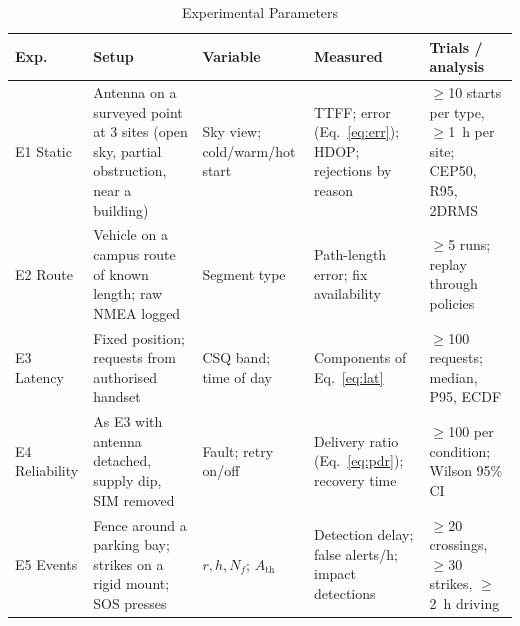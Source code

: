 \documentclass[conference]{IEEEtran}
\begin{document}
\begin{table}[!t]
\caption{Experimental Parameters}
\label{tab:params}
\centering
\scriptsize
\begin{tabular}{@{}L{1.5cm}L{4.4cm}L{2.6cm}L{3.8cm}L{3.9cm}@{}}
\toprule
Exp. & Setup & Variable & Measured & Trials / analysis \\
\midrule
E1 Static & Antenna on a surveyed point at 3 sites (open sky, partial obstruction, near a building) & Sky view; cold/warm/hot start & TTFF; error (Eq.~\ref{eq:err}); HDOP; rejections by reason & $\geq$10 starts per type, $\geq$1~h per site; CEP50, R95, 2DRMS \\
E2 Route & Vehicle on a campus route of known length; raw NMEA logged & Segment type & Path-length error; fix availability & $\geq$5 runs; replay through policies \\
E3 Latency & Fixed position; requests from authorised handset & CSQ band; time of day & Components of Eq.~\eqref{eq:lat} & $\geq$100 requests; median, P95, ECDF \\
E4 Reliability & As E3 with antenna detached, supply dip, SIM removed & Fault; retry on/off & Delivery ratio (Eq.~\ref{eq:pdr}); recovery time & $\geq$100 per condition; Wilson 95\% CI \\
E5 Events & Fence around a parking bay; strikes on a rigid mount; SOS presses & $r, h, N_f$; $A_{\mathrm{th}}$ & Detection delay; false alerts/h; impact detections & $\geq$20 crossings, $\geq$30 strikes, $\geq$2~h driving \\
\bottomrule
\end{tabular}
\end{table}
\end{document}
